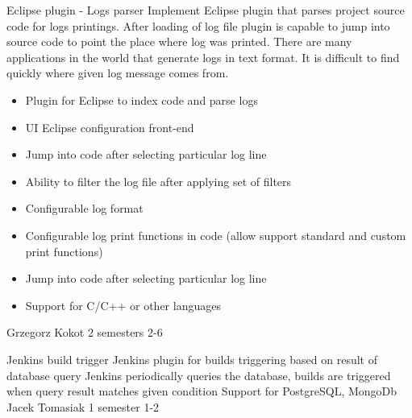 \begin{project}
{Eclipse plugin - Logs parser}
{
Implement Eclipse plugin that parses project source code for logs printings.
After loading of log file plugin is capable to jump into source code to point
the place where log was printed.
There are many applications in the world that generate logs in text format. It is difficult to find quickly where given log message comes from. 
}
{
\begin{itemize}
	\item Plugin for Eclipse to index code and parse logs
	\item UI Eclipse configuration front-end
	\item Jump into code after selecting particular log line
	\item Ability to filter the log file after applying set of filters
\end{itemize}
}
{
 \begin{itemize}
  \item Configurable log format
  \item Configurable log print functions in code (allow support standard and custom print functions)
  \item Jump into code after selecting particular log line
  \item Support for C/C++ or other languages
\end{itemize}
}
{Grzegorz Kokot}
{2 semesters}
{2-6}
\end{project}
\begin{project}
{Jenkins build trigger}
{Jenkins plugin for builds triggering based on result of database query} 
{ 
Jenkins periodically queries the database, builds are triggered when query result matches given condition
}
{Support for PostgreSQL, MongoDb}
{Jacek Tomasiak}
{1 semester}
{1-2}
\end{project}

